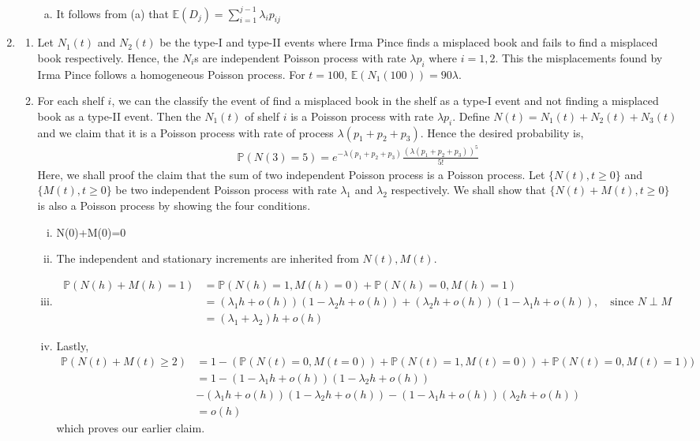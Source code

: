 \documentclass[a4paper,10pt]{article}
\theoremstyle{definition}
\begin{document}
\begin{enumerate}
\begin{enumerate}[(i)]
\begin{enumerate}[(a)]
\item It follows from (a) that $\mathbb{E}(D_j)=\sum_{i=1}^{j-1}\lambda_ip_{ij}$
\end{enumerate}

\end{enumerate}

\item
\begin{enumerate}
\item Let $N_1(t)$ and $N_2(t)$ be the type-I and type-II events where Irma Pince finds a misplaced book and fails to find a misplaced book respectively. Hence, the $N_i$s are independent Poisson process with rate $\lambda p_i$ where $i=1,2$. This the misplacements found by Irma Pince follows a homogeneous Poisson process. For $t=100$, $\mathbb{E}(N_1(100))=90 \lambda$.
\item For each shelf $i$, we can the classify the event of find a misplaced book in the shelf as a type-I event and not finding a misplaced book as a type-II event. Then the $N_1(t)$ of shelf $i$ is a Poisson process with rate $\lambda p_i$. Define $N(t)=N_1(t)+N_2(t)+N_3(t)$ and we claim that it is a Poisson process with rate of process $\lambda(p_1+p_2+p_3)$. Hence the desired probability is,
\begin{align*}
\mathbb{P}(N(3)=5)=e^{-\lambda(p_1+p_2+p_3)}\frac{(\lambda(p_1+p_2+p_3))^5}{5!}
\end{align*}
Here, we shall proof the claim that the sum of two independent Poisson process is a Poisson process. Let $\{N(t), t\geq 0\}$ and $\{M(t), t\geq 0\}$ be two independent Poisson process with rate $\lambda_1$ and $\lambda_2$ respectively. We shall show that $\{N(t)+M(t), t\geq 0\}$ is also a Poisson process by showing the four conditions.
\begin{enumerate}[(i)]
\item N(0)+M(0)=0
\item The independent and stationary increments are inherited from $N(t), M(t)$.
\item 
\begin{align*}
\mathbb{P}(N(h)+M(h)=1)&=\mathbb{P}(N(h)=1,M(h)=0)+\mathbb{P}(N(h)=0,M(h)=1)\\
&=(\lambda_1h+o(h))(1-\lambda_2h+o(h))+(\lambda_2h+o(h))(1-\lambda_1h+o(h)),\quad \text{since $N \perp M$}\\
&=(\lambda_1+\lambda_2)h+o(h)
\end{align*}
\item Lastly,
\begin{align*}
\mathbb{P}(N(t)+M(t)\geq 2)&= 1- (\mathbb{P}(N(t)=0,M(t=0))+\mathbb{P}(N(t)=1,M(t)=0))+\mathbb{P}(N(t)=0,M(t)=1))\\
&= 1- (1-\lambda_1h+o(h))(1-\lambda_2h+o(h))\\
&-(\lambda_1h+o(h))(1-\lambda_2h+o(h))-(1-\lambda_1h+o(h))(\lambda_2h+o(h))\\
&=o(h)
\end{align*}
which proves our earlier claim.
\end{enumerate}


\end{enumerate}
\end{enumerate}
\end{document}
